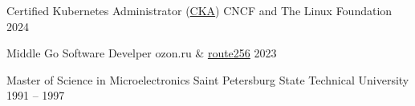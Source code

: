 
\eduEntry
  {Certified Kubernetes Administrator (\href{https://www.credly.com/badges/35cd73fb-d95d-4f98-b7ce-caa6664475dc/public_url}{CKA})}
  {CNCF and The Linux Foundation}
  {2024}

\eduEntry
  {Middle Go Software Develper}
  {ozon.ru \& \href{https://route256.ozon.ru/}{route256}}
  {2023}

\eduEntry
  {Master of Science in Microelectronics}
  {Saint Petersburg State Technical University}
  {1991 -- 1997}
